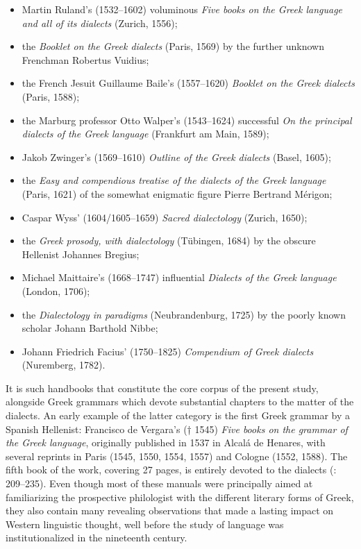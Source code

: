 \begin{itemize}
\item 
Martin Ruland’s (1532–1602) voluminous \textit{Five books on the Greek language and all of its dialects} (Zurich, 1556);

\item 
the \textit{Booklet on the Greek dialects} (Paris, 1569) by the further unknown Frenchman Robertus Vuidius;

\item 
the French Jesuit Guillaume Baile’s (1557–1620) \textit{Booklet on the Greek dialects} (Paris, 1588);

\item 
the Marburg professor Otto Walper’s (1543–1624) successful \textit{On the principal dialects of the Greek language} (Frankfurt am Main, 1589);

\item 
Jakob Zwinger’s (1569–1610) \textit{Outline of the Greek dialects} (Basel, 1605);

\item 
the \textit{Easy and compendious treatise of the dialects of the Greek language} (Paris, 1621) of the somewhat enigmatic figure Pierre Bertrand Mérigon;

\item 
Caspar Wyss’ (1604/1605–1659) \textit{Sacred dialectology} (Zurich, 1650);

\item 
the \textit{Greek prosody, with dialectology} (Tübingen, 1684) by the obscure Hellenist Johannes Bregius;

\item 
Michael Maittaire’s (1668–1747) influential \textit{Dialects of the Greek language} (London, 1706);

\item 
the \textit{Dialectology in paradigms} (Neubrandenburg, 1725) by the poorly known scholar Johann Barthold Nibbe;

\item 
Johann Friedrich Facius’ (1750–1825) \textit{Compendium of Greek dialects} (Nuremberg, 1782).

\end{itemize}

It is such handbooks that constitute the core corpus of the present study, alongside Greek grammars which devote substantial chapters to the matter of the dialects. An early example of the latter category is the first Greek grammar by a Spanish Hellenist: Francisco de Vergara’s († 1545) \textit{Five books on the grammar of the Greek language}, originally published in 1537 in Alcalá de Henares, with several reprints in Paris (1545, 1550, 1554, 1557) and Cologne (1552, 1588). The fifth book of the work, covering 27 pages, is entirely devoted to the dialects (\citealt{Vergara1537}: 209–235). Even though most of these manuals were principally aimed at familiarizing the prospective philologist with the different literary forms of Greek, they also contain many revealing observations that made a lasting impact on Western linguistic thought, well before the study of language was institutionalized in the nineteenth century.

